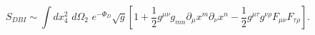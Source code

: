 \begin{equation}\label{sdbiI}
S_{DBI} \sim \int dx_4^2 \,\, d\Omega_2 \,\, e^{-\Phi_D}\sqrt{g}\left [
1+ \frac{1}{2} g^{\mu\nu} g_{mn} \partial_\mu x^m 
\partial_\nu x^n - \frac{1}{2} g^{\mu\tau}g^{\nu\rho}
F_{\mu\nu}F_{\tau\rho} \right].
\end{equation}

